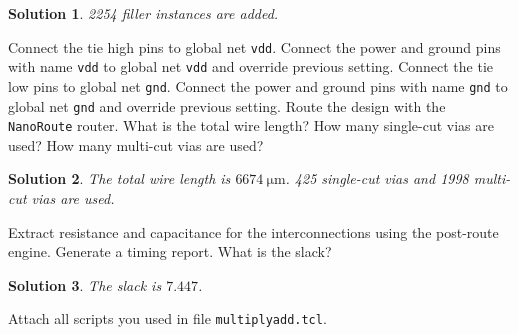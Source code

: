 \documentclass[acmlarge,screen=true,anonymous=false,11pt]{acmart}
\newtheorem*{solution*}{Solution}
\begin{document}
\begin{solution*}
    2254 filler instances are added.
\end{solution*}
\begin{example}
    Connect the tie high pins to global net \texttt{vdd}.
    Connect the power and ground pins with name \texttt{vdd} to global net \texttt{vdd}
    and override previous setting.
    Connect the tie low pins to global net \texttt{gnd}.
    Connect the power and ground pins with name \texttt{gnd} to global net \texttt{gnd}
    and override previous setting.
    Route the design with the \texttt{NanoRoute} router.
    What is the total wire length?
    How many single-cut vias are used?
    How many multi-cut vias are used?
\end{example}
\begin{solution*}
    The total wire length is $6674~\mathrm{\mu m}$.
    425 single-cut vias and 1998 multi-cut vias are used.
\end{solution*}
\begin{example}
    Extract resistance and capacitance for the interconnections using the post-route engine.
    Generate a timing report.
    What is the slack?
\end{example}
\begin{solution*}
    The slack is $7.447$.
\end{solution*}
\begin{example}
    Attach all scripts you used in file \texttt{multiplyadd.tcl}.
\end{example}
\end{document}
